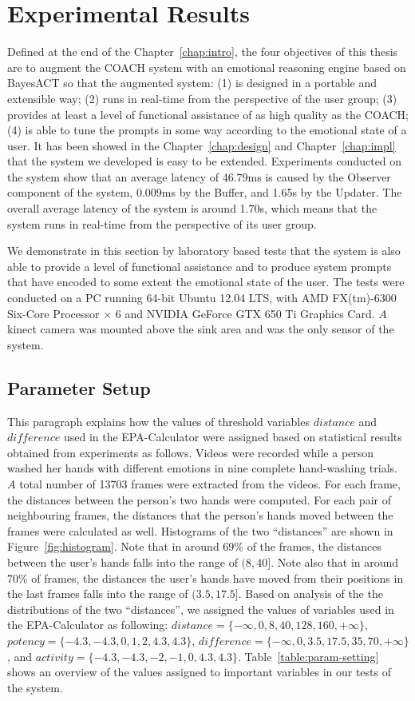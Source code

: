 \chapter{Experimental Results}
\label{chap:result}

Defined at the end of the Chapter~\ref{chap:intro}, the four objectives of this thesis are to augment the COACH system with an emotional reasoning engine based on BayesACT so that the augmented system: (1) is designed in a portable and extensible way; (2) runs in real-time from the perspective of the user group; (3) provides at least a level of functional assistance of as high quality as the COACH; (4) is able to tune the prompts in some way according to the emotional state of a user. It has been showed in the Chapter~\ref{chap:design} and Chapter~\ref{chap:impl} that the system we developed is easy to be extended. Experiments conducted on the system show that an average latency of 46.79ms is caused by the Observer component of the system, 0.009ms by the Buffer, and 1.65s by the Updater. The overall average latency of the system is around 1.70s, which means that the system runs in real-time from the perspective of its user group. 

We demonstrate in this section by laboratory based tests that the system is also able to provide a level of functional assistance and to produce system prompts that have encoded to some extent the emotional state of the user. The tests were conducted on a PC running 64-bit Ubuntu 12.04 LTS, with AMD FX(tm)-6300 Six-Core Processor × 6 and NVIDIA GeForce GTX 650 Ti Graphics Card. $A$ kinect camera was mounted above the sink area and was the only sensor of the system.

\section{Parameter Setup}
This paragraph explains how the values of threshold variables $distance$ and $difference$ used in the EPA-Calculator were assigned based on statistical results obtained from experiments as follows. Videos were recorded while a person washed her hands with different emotions in nine complete hand-washing trials. $A$ total number of 13703 frames were extracted from the videos. For each frame, the distances between the person's two hands were computed. For each pair of neighbouring frames, the distances that the person's hands moved between the frames were calculated as well. Histograms of the two ``distances'' are shown in Figure~\ref{fig:histogram}. Note that in around 69\% of the frames, the distances between the user's hands falls into the range of $(8, 40]$. Note also that in around 70\% of frames, the distances the user's hands have moved from their positions in the last frames falls into the range of $(3.5, 17.5]$. Based on analysis of the the distributions of the two ``distances'', we assigned the values of variables used in the EPA-Calculator as following: $distance = \{-\infty, 0, 8, 40, 128, 160, +\infty\}$, $potency = \{-4.3, -4.3, 0, 1, 2, 4.3, 4.3\}$, $difference = \{-\infty, 0, 3.5, 17.5, 35, 70, +\infty\}$, and $activity = \{-4.3, -4.3, -2, -1, 0, 4.3, 4.3\}$. Table~\ref{table:param-setting} shows an overview of the values assigned to important variables in our tests of the system. 

